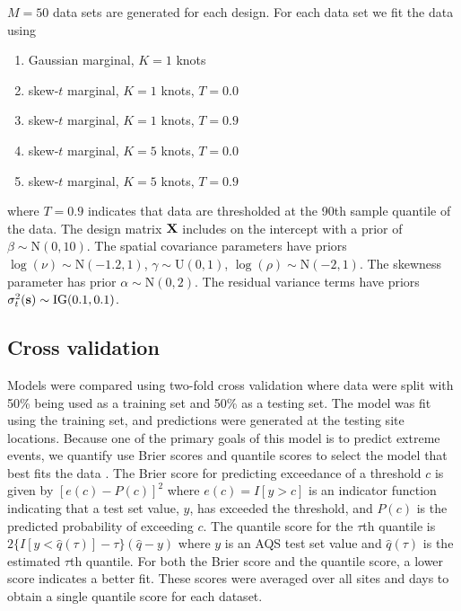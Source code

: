 \documentclass[11pt]{article}
\begin{document}
$M = 50$ data sets are generated for each design.
For each data set we fit the data using
\begin{enumerate} \setlength{\itemsep}{-0.5em}
  \item Gaussian marginal, $K=1$ knots
  \item skew-$t$ marginal, $K=1$ knots, $T=0.0$
  \item skew-$t$ marginal, $K=1$ knots, $T=0.9$
  \item skew-$t$ marginal, $K=5$ knots, $T=0.0$
  \item skew-$t$ marginal, $K=5$ knots, $T=0.9$
\end{enumerate}
where $T=0.9$ indicates that data are thresholded at the 90th sample quantile of the data.
The design matrix $\mbox{\bf X}$ includes on the intercept with a prior of $\beta \sim \text{N}(0, 10)$.
The spatial covariance parameters have priors $\log(\nu) \sim \text{N}(-1.2, 1)$, $\gamma \sim \text{U}(0, 1)$, $\log(\rho) \sim \text{N}(-2, 1)$.
The skewness parameter has prior $\alpha \sim \text{N}(0, 2)$.
The residual variance terms have priors $\sigma^2_t(\mbox{\bf s}) \sim \text{IG}(0.1, 0.1)$.

\subsection{Cross validation}\label{s:modelselect}
Models were compared using two-fold cross validation where data were split with 50\% being used as a training set and 50\% as a testing set.
The model was fit using the training set, and predictions were generated at the testing site locations.
Because one of the primary goals of this model is to predict extreme events, we quantify use Brier scores and quantile scores to select the model that best fits the data \citep{Gneiting2007}.
The Brier score for predicting exceedance of a threshold $c$ is given by $[e(c) - P(c)]^2$ where $e(c) = I[y>c]$ is an indicator function indicating that a test set value, $y$, has exceeded the threshold, and $P(c)$ is the predicted probability of exceeding $c$.
The quantile score for the $\tau$th quantile is $2\{ I[y < \widehat{q}(\tau)] - \tau\} (\widehat{q} - y)$ where $y$ is an AQS test set value and $\widehat{q}(\tau)$ is the estimated $\tau$th quantile.
For both the Brier score and the quantile score, a lower score indicates a better fit.
These scores were averaged over all sites and days to obtain a single quantile score for each dataset.
\end{document}
